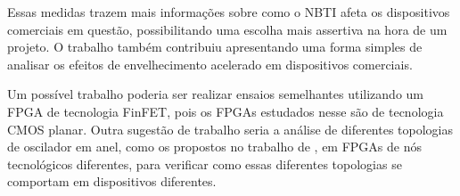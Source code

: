 Essas medidas trazem mais informações sobre como o NBTI afeta os dispositivos comerciais em questão, possibilitando uma escolha mais assertiva na hora de um projeto. O trabalho também contribuiu apresentando uma forma simples de analisar os efeitos de envelhecimento acelerado em dispositivos comerciais.

Um possível trabalho poderia ser realizar ensaios semelhantes utilizando um FPGA de tecnologia FinFET, pois os FPGAs estudados nesse são de tecnologia CMOS planar. Outra sugestão de trabalho seria a análise de diferentes topologias de oscilador em anel, como os propostos no trabalho de \cite{Sato}, em FPGAs de nós tecnológicos diferentes, para verificar como essas diferentes topologias se comportam em dispositivos diferentes.














